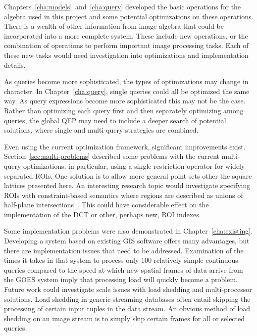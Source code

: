\documentclass{ucdthesis}       %
\begin{document}
Chapters~\ref{cha:models}~and~\ref{cha:query} developed the basic
operations for the algebra used in this project and some potential
optimizations on these operations.  There is a wealth of other
information from image algebra that could be incorporated into a more
complete system.  These include new operations, or the combination of
operations to perform important image processing tasks.  Each of these
new tasks would need investigation into optimizations and
implementation details.

As queries become more sophisticated, the types of optimizations may
change in character.  In Chapter~\ref{cha:query}, single queries could
all be optimized the same way.  As query expressions become more
sophisticated this may not be the case.  Rather than optimizing each
query first and then separately optimizing among queries, the global
\ac{QEP} may need to include a deeper search of potential solutions,
where single and multi-query strategies are combined.

Even using the current optimization framework, significant
improvements exist.  Section~\ref{sec:multi-problems} described some
problems with the current multi-query optimizations, in particular,
using a single restriction operator for widely separated \acp{ROI}.
One solution is to allow more general point sets other the square
lattices presented here.  An interesting research topic would
investigate specifying \acp{ROI} with constraint-based semantics where
regions are described as unions of half-plane
intersections~\cite{rigaux02spatial-datab}.  This could have
considerable effect on the implementation of the \ac{DCT} or other,
perhaps new, \ac{ROI} indexes.

Some implementation problems were also demonstrated in
Chapter~\ref{cha:existing}.  Developing a system based on existing
\ac{GIS} software offers many advantages, but there are implementation
issues that need to be addressed.  Examination of the times it takes
in that system to process only 100 relatively simple continuous
queries compared to the speed at which new spatial frames of data
arrive from the \ac{GOES} system imply that processing load will
quickly become a problem.  Future work could investigate scale issues
with load shedding and multi-processor solutions.  Load shedding in
generic streaming databases often entail skipping the processing of
certain input tuples in the data stream.  An obvious method of load
shedding on an image stream is to simply skip certain frames for all
or selected queries.
\end{document}

